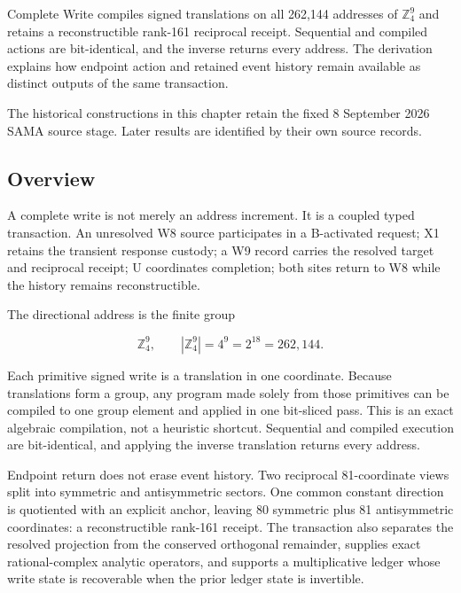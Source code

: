 \label{viii-ch04-the-algebra-of-a-complete-write}

Complete Write compiles signed translations on all 262,144 addresses of $\mathbb Z_4^9$ and retains a reconstructible rank-161 reciprocal receipt. Sequential and compiled actions are bit-identical, and the inverse returns every address. The derivation explains how endpoint action and retained event history remain available as distinct outputs of the same transaction.

The historical constructions in this chapter retain the fixed 8 September 2026 SAMA source stage. Later results are identified by their own source records.

\subsection{Overview}\label{viii-ch04-overview}

A complete write is not merely an address increment. It is a coupled
typed transaction. An unresolved W8 source participates in a B-activated
request; X1 retains the transient response custody; a W9 record carries
the resolved target and reciprocal receipt; U coordinates completion;
both sites return to W8 while the history remains reconstructible.

The directional address is the finite group

\[
\mathbb Z_4^9,
\qquad |\mathbb Z_4^9|=4^9=2^{18}=262{,}144.
\]

Each primitive signed write is a translation in one coordinate. Because
translations form a group, any program made solely from those primitives
can be compiled to one group element and applied in one bit-sliced pass.
This is an exact algebraic compilation, not a heuristic shortcut.
Sequential and compiled execution are bit-identical, and applying the
inverse translation returns every address.

Endpoint return does not erase event history. Two reciprocal
81-coordinate views split into symmetric and antisymmetric sectors. One
common constant direction is quotiented with an explicit anchor, leaving
80 symmetric plus 81 antisymmetric coordinates: a reconstructible
rank-161 receipt. The transaction also separates the resolved projection
from the conserved orthogonal remainder, supplies exact rational-complex
analytic operators, and supports a multiplicative ledger whose write
state is recoverable when the prior ledger state is invertible.

